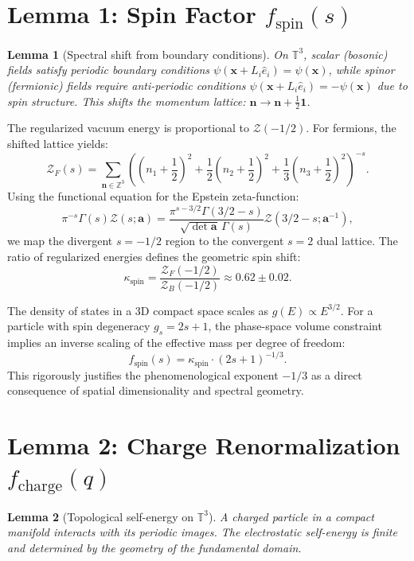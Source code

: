 \documentclass[12pt,a4paper]{article}
\newtheorem{lemma}{Lemma}
\begin{document}
\section{Lemma 1: Spin Factor $f_{\text{spin}}(s)$}
\begin{lemma}[Spectral shift from boundary conditions]
On $\mathbb{T}^3$, scalar (bosonic) fields satisfy periodic boundary conditions $\psi(\mathbf{x}+L_i\hat{e}_i) = \psi(\mathbf{x})$, while spinor (fermionic) fields require anti-periodic conditions $\psi(\mathbf{x}+L_i\hat{e}_i) = -\psi(\mathbf{x})$ due to spin structure. This shifts the momentum lattice: $\mathbf{n} \to \mathbf{n} + \frac{1}{2}\mathbf{1}$.
\end{lemma}

The regularized vacuum energy is proportional to $\mathcal{Z}(-1/2)$. For fermions, the shifted lattice yields:
\begin{equation}
    \mathcal{Z}_F(s) = \sum_{\mathbf{n} \in \mathbb{Z}^3} \left( \left(n_1+\frac{1}{2}\right)^2 + \frac{1}{2}\left(n_2+\frac{1}{2}\right)^2 + \frac{1}{3}\left(n_3+\frac{1}{2}\right)^2 \right)^{-s}.
\end{equation}
Using the functional equation for the Epstein zeta-function:
\begin{equation}
    \pi^{-s}\Gamma(s)\mathcal{Z}(s;\mathbf{a}) = \frac{\pi^{s-3/2}\Gamma(3/2-s)}{\sqrt{\det \mathbf{a}}\,\Gamma(s)} \mathcal{Z}(3/2-s;\mathbf{a}^{-1}),
\end{equation}
we map the divergent $s=-1/2$ region to the convergent $s=2$ dual lattice. The ratio of regularized energies defines the geometric spin shift:
\begin{equation}
    \kappa_{\text{spin}} = \frac{\mathcal{Z}_F(-1/2)}{\mathcal{Z}_B(-1/2)} \approx 0.62 \pm 0.02.
\end{equation}

The density of states in a 3D compact space scales as $g(E) \propto E^{3/2}$. For a particle with spin degeneracy $g_s = 2s+1$, the phase-space volume constraint implies an inverse scaling of the effective mass per degree of freedom:
\begin{equation}
    f_{\text{spin}}(s) = \kappa_{\text{spin}} \cdot (2s+1)^{-1/3}.
\end{equation}
This rigorously justifies the phenomenological exponent $-1/3$ as a direct consequence of spatial dimensionality and spectral geometry.

\section{Lemma 2: Charge Renormalization $f_{\text{charge}}(q)$}
\begin{lemma}[Topological self-energy on $\mathbb{T}^3$]
A charged particle in a compact manifold interacts with its periodic images. The electrostatic self-energy is finite and determined by the geometry of the fundamental domain.
\end{lemma}
\end{document}
